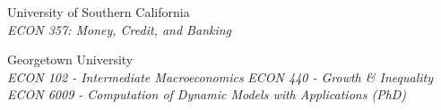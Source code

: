 \documentclass[11pt]{article}
\begin{document}
%
%
%
%
%
%
%

\begin{samepage}%
\ind University of Southern California  \\
\emph{ECON 357: Money, Credit, and Banking}
\par\end{samepage}

\smallskip
\begin{samepage}
\ind Georgetown University  \\
\emph{ECON 102 - Intermediate Macroeconomics} \newline
\emph{ECON 440 - Growth \& Inequality} \newline
\emph{ECON 6009 - Computation of Dynamic Models with Applications (PhD)}
\par\end{samepage}
\end{document}
